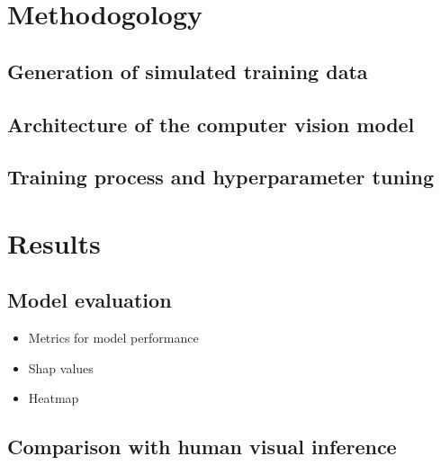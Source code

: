 \documentclass[]{interact}
\theoremstyle{plain}%
\theoremstyle{definition}
\theoremstyle{remark}
\providecommand{\tightlist}{%
  \setlength{\itemsep}{0pt}\setlength{\parskip}{0pt}}
\def\tightlist{}
\begin{document}
\hypertarget{methodogology}{%
\section{Methodogology}\label{methodogology}}

\hypertarget{generation-of-simulated-training-data}{%
\subsection{Generation of simulated training
data}\label{generation-of-simulated-training-data}}

\hypertarget{architecture-of-the-computer-vision-model}{%
\subsection{Architecture of the computer vision
model}\label{architecture-of-the-computer-vision-model}}

\hypertarget{training-process-and-hyperparameter-tuning}{%
\subsection{Training process and hyperparameter
tuning}\label{training-process-and-hyperparameter-tuning}}

\hypertarget{results}{%
\section{Results}\label{results}}

\hypertarget{model-evaluation}{%
\subsection{Model evaluation}\label{model-evaluation}}

\begin{itemize}
\tightlist
\item
  Metrics for model performance
\item
  Shap values
\item
  Heatmap
\end{itemize}

\hypertarget{comparison-with-human-visual-inference}{%
\subsection{Comparison with human visual
inference}\label{comparison-with-human-visual-inference}}
\end{document}
